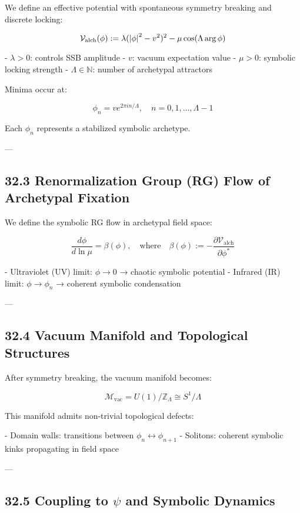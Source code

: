 \documentclass[12pt]{article}
\begin{document}
\begin{enumerate}
We define an effective potential with spontaneous symmetry breaking and discrete locking:

\[
\mathcal{V}_{\text{alch}}(\phi) := \lambda (\abs{\phi}^2 - v^2)^2 - \mu \cos(\Lambda \arg \phi)
\]

- $\lambda > 0$: controls SSB amplitude  
- $v$: vacuum expectation value  
- $\mu > 0$: symbolic locking strength  
- $\Lambda \in \mathbb{N}$: number of archetypal attractors

Minima occur at:

\[
\phi_n = v e^{2\pi i n / \Lambda}, \quad n = 0,1,\dots,\Lambda-1
\]

Each $\phi_n$ represents a stabilized symbolic archetype.

---

\subsection*{32.3 Renormalization Group (RG) Flow of Archetypal Fixation}

We define the symbolic RG flow in archetypal field space:

\[
\frac{d \phi}{d \ln \mu} = \beta(\phi), \quad \text{where} \quad
\beta(\phi) := -\frac{\partial \mathcal{V}_{\text{alch}}}{\partial \phi^*}
\]

- Ultraviolet (UV) limit: $\phi \to 0$ → chaotic symbolic potential  
- Infrared (IR) limit: $\phi \to \phi_n$ → coherent symbolic condensation

---

\subsection*{32.4 Vacuum Manifold and Topological Structures}

After symmetry breaking, the vacuum manifold becomes:

\[
\mathcal{M}_{\text{vac}} = U(1)/\mathbb{Z}_\Lambda \cong S^1/\Lambda
\]

This manifold admits non-trivial topological defects:

- Domain walls: transitions between $\phi_n \leftrightarrow \phi_{n+1}$  
- Solitons: coherent symbolic kinks propagating in field space

---

\subsection*{32.5 Coupling to $\psi$ and Symbolic Dynamics}


\end{enumerate}
\end{document}
